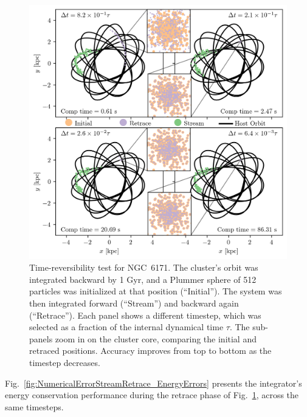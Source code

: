         \begin{figure}
            \centering
            \includegraphics[width=\linewidth]{images/NumericalErrorStreamRetrace_NGC6171.png}
            \caption{Time-reversibility test for NGC~6171. The cluster's orbit was integrated backward by 1 Gyr, and a Plummer sphere of 512 particles was initialized at that position (``Initial''). The system was then integrated forward (``Stream'') and backward again (``Retrace''). Each panel shows a different timestep, which was selected as a fraction of the internal dynamical time $\tau$. The sub-panels zoom in on the cluster core, comparing the initial and retraced positions. Accuracy improves from top to bottom as the timestep decreases.}
            \label{fig:NumericalErrorStreamRetrace_NGC6171}
        \end{figure}

        Fig.~\ref{fig:NumericalErrorStreamRetrace_EnergyErrors} presents the integrator's energy conservation performance during the retrace phase of Fig.~\ref{fig:NumericalErrorStreamRetrace_NGC6171}, across the same timesteps.

